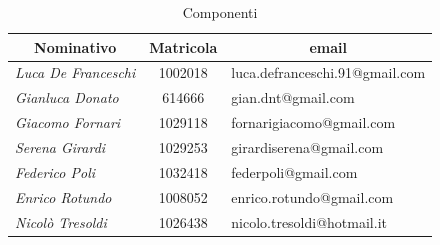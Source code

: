 	\def\arraystretch{1.1}
	\begin{table}[h]
	\centering
	\begin{tabular}{ l c l }
	\hline
	\multicolumn{1}{c}{\textbf{Nominativo}} & \multicolumn{1}{c}{\textbf{Matricola}} & \multicolumn{1}{c}{\textbf{email}} \\
	\hline
	\textit{Luca De Franceschi} & 1002018 & luca.defranceschi.91@gmail.com \\
	\textit{Gianluca Donato} & 614666 & gian.dnt@gmail.com \\
	\textit{Giacomo Fornari} & 1029118 & fornarigiacomo@gmail.com \\
	\textit{Serena Girardi} & 1029253 & girardiserena@gmail.com \\
	\textit{Federico Poli} & 1032418 & federpoli@gmail.com \\
	\textit{Enrico Rotundo} & 1008052 & enrico.rotundo@gmail.com \\
	\textit{Nicolò Tresoldi} & 1026438 & nicolo.tresoldi@hotmail.it \\
	\hline
	\end{tabular}
	\caption{Componenti}
	\end{table}
	